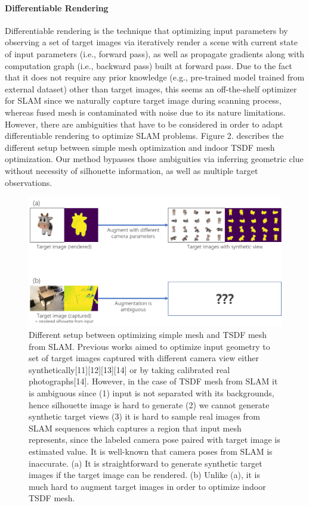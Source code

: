 \paragraph{Differentiable Rendering}
Differentiable rendering is the technique that 
optimizing input parameters by observing a set of target images 
via iteratively render a scene with current state of input parameters (i.e., forward pass), 
as well as propagate gradients along with computation graph (i.e., backward pass) built at forward pass. 
Due to the fact that it does not require any prior knowledge (e.g., pre-trained model trained from external dataset) 
other than target images, this seems an off-the-shelf optimizer for SLAM 
since we naturally capture target image during scanning process, 
whereas fused mesh is contaminated with noise due to its nature limitations. 
However, there are ambiguities that have to be considered 
in order to adapt differentiable rendering to optimize SLAM problems. 
Figure 2. describes the different setup between simple mesh optimization 
and indoor TSDF mesh optimization. 
Our method bypasses those ambiguities via inferring geometric clue 
without necessity of silhouette information, as well as multiple target observations.
\begin{figure}
    \includegraphics[width=\columnwidth]{figures/2_prev_difference_simple_mesh_and_tsdf_mesh.png}
    \caption{Different setup between optimizing simple mesh and TSDF mesh from SLAM. Previous works aimed to optimize input geometry to set of target images captured with different camera view either synthetically[11][12][13][14] or by taking calibrated real photographs[14]. However, in the case of TSDF mesh from SLAM it is ambiguous since (1) input is not separated with its backgrounds, hence silhouette image is hard to generate (2) we cannot generate synthetic target views (3) it is hard to sample real images from SLAM sequences which captures a region that input mesh represents, since the labeled camera pose paired with target image is estimated value. It is well-known that camera poses from SLAM is inaccurate. (a) It is straightforward to generate synthetic target images if the target image can be rendered. (b) Unlike (a), it is much hard to augment target images in order to optimize indoor TSDF mesh.}
    \label{fig:two}
\end{figure}